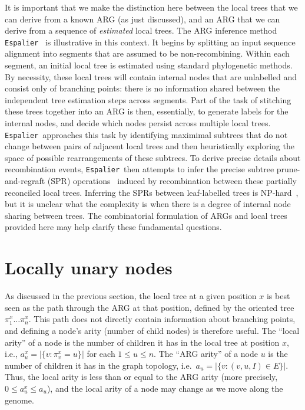 \documentclass{article}
\newcommand{\espalier}[0]{\texttt{Espalier}}
\newcommand{\arbores}[0]{\texttt{Arbores}}
\begin{document}
It is important that we make the distinction here between the local
trees that we can derive from a known ARG (as just discussed),
and an ARG that we can derive from a sequence of \emph{estimated}
local trees.
The ARG inference method
\espalier~\citep{rasmussen2022espalier} is illustrative in this context.
It begins by splitting an input sequence alignment into
segments that are assumed to be non-recombining. Within
each segment, an initial local tree is estimated using
standard phylogenetic methods. By necessity, these local
trees will contain internal nodes that are unlabelled and
consist only of branching points: there is no information
shared between the independent tree estimation steps
across segments. Part of the task of stitching
these trees together
into an ARG is then, essentially, to generate labels for
the internal nodes, and decide which nodes persist
across multiple local trees.
\espalier\ approaches this task
by identifying maximimal subtrees
that do not change between pairs of adjacent
local trees and then
heuristically exploring the space of possible
rearrangements of these subtrees.
To derive precise details about recombination events,
\espalier\ then attempts to infer
the precise subtree prune-and-regraft (SPR)
operations~\citep{hein1990reconstructing,song2003on,song2006properties}
induced by recombination between these partially reconciled local trees.
Inferring the SPRs between leaf-labelled trees is
NP-hard~\citep{hein1996complexity,allen2001subtree,bordewich2005computational},
but it is unclear what the complexity is when there
is a degree of internal node sharing between trees.
The combinatorial formulation of ARGs and local trees provided here
may help clarify these fundamental questions.

\section{Locally unary nodes}
\label{sec-locally-unary-edges}
As discussed in the previous section, the local tree at a given position
$x$ is best seen as the path through the ARG at that position, defined
by the oriented tree $\pi^x_1\dots\pi^x_n$. This path does not directly
contain information about branching points, and defining a
node's arity (number of child nodes) is therefore useful.
The ``local arity'' of a node is the number of children it has
in the local tree at position $x$, i.e., $a^x_u = |\{v : \pi^x_v = u\}|$
for each $1 \leq u \leq n$. The ``ARG arity'' of a node $u$ is the
number of children it has in the graph topology, i.e.\
$a_u = |\{v: (v, u, I) \in E\}|$. Thus, the local arity is less than
or equal to the ARG arity (more precisely, $0 \leq a^x_u \leq a_u$),
and the local arity of a node may change as we move along the genome.
\end{document}
